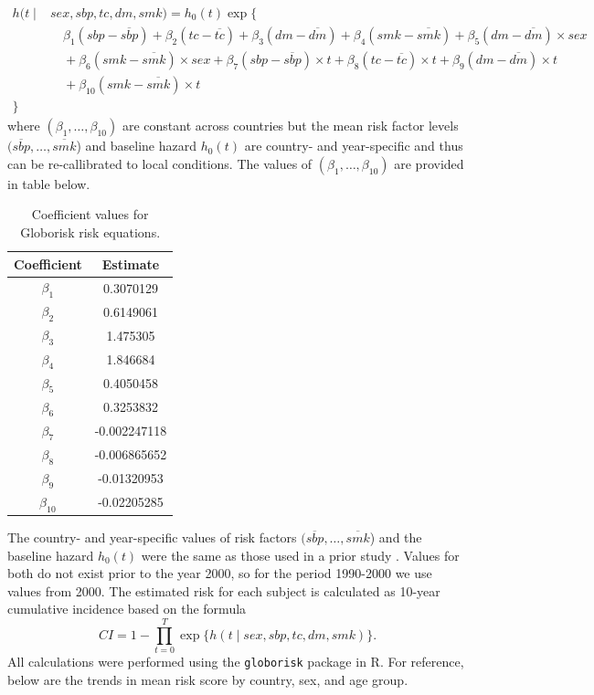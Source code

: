 \documentclass[12pt]{article}
\begin{document}
\begin{appendix}
\begin{refsection}
    \begin{align*}
        h(t \mid& sex, sbp, tc, dm, smk) = h_0(t) \exp\big\{ \\
        &\quad \beta_1 (sbp - \overline{sbp}) + \beta_2 (tc - \overline{tc}) + \beta_3 (dm - \overline{dm}) + \beta_4 (smk - \overline{smk}) + \beta_5 (dm - \overline{dm}) \times sex
        \\ &\quad + \beta_6 (smk - \overline{smk}) \times sex + \beta_7 (sbp - \overline{sbp}) \times t + \beta_8 (tc - \overline{tc}) \times t + \beta_9 (dm - \overline{dm}) \times t
        \\ &\quad  + \beta_{10} (smk - \overline{smk}) \times t \\
        \big\}
    \end{align*}
    where $(\beta_1, \ldots, \beta_{10})$ are constant across countries but the mean risk factor levels $(\overline{sbp}, \ldots, \overline{smk}$) and baseline hazard $h_0(t)$ are country- and year-specific and thus can be re-callibrated to local conditions. The values of $(\beta_1, \ldots, \beta_{10})$ are provided in table below.
    \begin{table}[H]
        \centering
        \caption{Coefficient values for Globorisk risk equations.}
        \label{tab:coefs}
        \begin{tabular}[t]{cc}
            \toprule
            Coefficient & Estimate  \\
            \midrule
            $\beta_1$ & 0.3070129 \\
            $\beta_2$ & 0.6149061 \\
            $\beta_3$ & 1.475305 \\
            $\beta_4$ & 1.846684 \\
            $\beta_5$ & 0.4050458 \\
            $\beta_6$ & 0.3253832 \\
            $\beta_7$ & -0.002247118 \\
            $\beta_8$ & -0.006865652 \\
            $\beta_9$ & -0.01320953 \\
            $\beta_{10}$ & -0.02205285 \\
            \bottomrule
            \end{tabular}
    \end{table}
    The country- and year-specific values of risk factors $(\overline{sbp}, \ldots, \overline{smk}$) and the baseline hazard $h_0(t)$ were the same as those used in a prior study \cite{ueda_laboratory-based_2017}. Values for both do not exist prior to the year 2000, so for the period 1990-2000 we use values from 2000.  The estimated risk for each subject is calculated as 10-year cumulative incidence based on the formula
    \begin{equation*}
        CI = 1 - \prod_{t=0}^T\exp\{h(t \mid sex, sbp, tc, dm, smk)\}.
    \end{equation*}
    All calculations were performed using the \texttt{globorisk} package \cite{boyer_globorisk_2022} in R. For reference, below are the trends in mean risk score by country, sex, and age group. 


\end{refsection}
\end{appendix}
\end{document}
